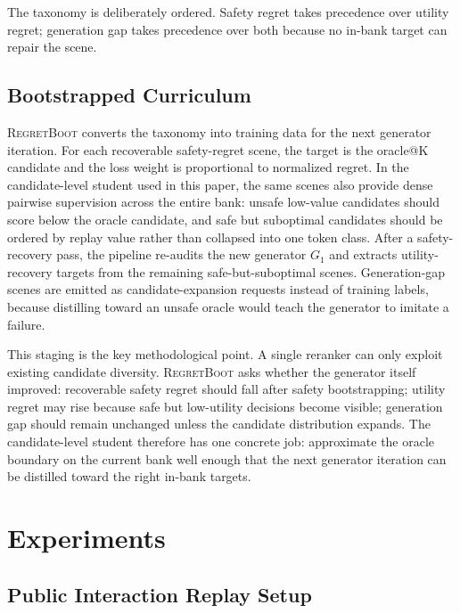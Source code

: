 \documentclass{article}
\newcommand{\method}{\textsc{RegretBoot}}
\begin{document}
The taxonomy is deliberately ordered. Safety regret takes precedence over utility regret;
generation gap takes precedence over both because no in-bank target can repair the scene.

\subsection{Bootstrapped Curriculum}
\label{sec:method:curriculum}

\method{} converts the taxonomy into training data for the next generator iteration.
For each recoverable safety-regret scene, the target is the oracle@K candidate and the
loss weight is proportional to normalized regret. In the candidate-level student used in
this paper, the same scenes also provide dense pairwise supervision across the entire bank:
unsafe low-value candidates should score below the oracle candidate, and safe but
suboptimal candidates should be ordered by replay value rather than collapsed into one
token class. After a safety-recovery pass, the pipeline re-audits the new generator
$G_1$ and extracts utility-recovery targets from the remaining safe-but-suboptimal scenes.
Generation-gap scenes are emitted as candidate-expansion requests instead of training
labels, because distilling toward an unsafe oracle would teach the generator to imitate a
failure.

This staging is the key methodological point. A single reranker can only exploit existing
candidate diversity. \method{} asks whether the generator itself improved: recoverable
safety regret should fall after safety bootstrapping; utility regret may rise because safe
but low-utility decisions become visible; generation gap should remain unchanged unless
the candidate distribution expands. The candidate-level student therefore has one concrete
job: approximate the oracle boundary on the current bank well enough that the next
generator iteration can be distilled toward the right in-bank targets.

\section{Experiments}
\label{sec:experiments}

\subsection{Public Interaction Replay Setup}
\end{document}
